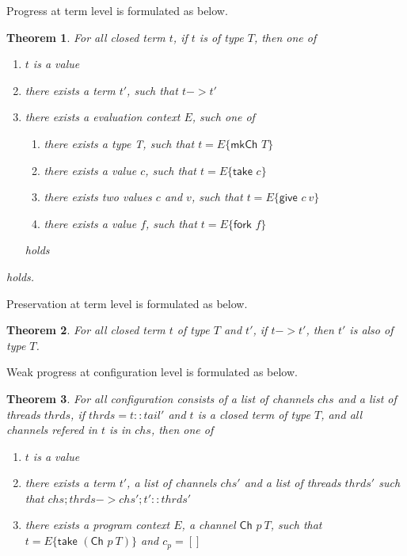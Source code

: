 \documentclass{article}
\newtheorem{theorem}{Theorem}
\newcommand{\sco}[1]{\textsf{#1}}
\newcommand{\fork}[1]{\sco{fork }#1}
\newcommand{\give}[2]{\sco{give } #1\ #2}
\newcommand{\take}[1]{\sco{take } #1}
\newcommand{\mkch}[1]{\sco{mkCh } #1}
\newcommand{\channel}[2]{\sco{Ch }#1\ #2}
\begin{document}
Progress at term level is formulated as below.

\begin{theorem}
    For all closed term $t$, if $t$ is of type $T$, then one of
    \begin{enumerate}
        \item $t$ is a value
        \item there exists a term $t'$, such that $t -> t'$
        \item there exists a evaluation context $E$, such one of
                \begin{enumerate}
                    \item there exists a type T, such that $t = E\{\mkch{T}\}$
                    \item there exists a value $c$, such that $t = E\{\take{c}\}$
                    \item there exists two values $c$ and $v$, such that $t = E\{\give{c}{v}\}$
                    \item there exists a value $f$, such that $t = E\{\fork{f}\}$
                \end{enumerate}
              holds
    \end{enumerate}
    holds.
\end{theorem}

Preservation at term level is formulated as below.

\begin{theorem}
    For all closed term $t$ of type $T$ and $t'$, if $t -> t'$, then $t'$ is also of type $T$.
\end{theorem}

Weak progress at configuration level is formulated as below.

\begin{theorem}
    For all configuration consists of a list of channels $chs$ and a list of threads $thrds$,
    if $thrds = t :: tail'$ and $t$ is a closed term of type $T$, and all channels refered in $t$ is
    in $chs$, then one of
    \begin{enumerate}
        \item $t$ is a value
        \item there exists a term $t'$, a list of channels $chs'$ and a list of threads $thrds'$
                such that $chs;thrds -> chs';t' :: thrds'$
        \item there exists a program context $E$, a channel $\channel{p}{T}$, such that
                $t = E\{\take{(\channel{p}{T})}\}$ and $c_p = []$
    \end{enumerate}
\end{theorem}
\end{document}
